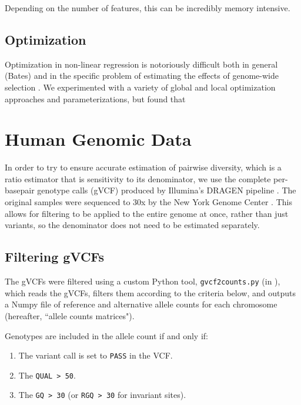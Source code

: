\documentclass[11pt]{article}
\begin{document}
Depending on the number of features, this can be incredibly memory intensive.

\subsection{Optimization}

Optimization in non-linear regression is notoriously difficult both in general
(Bates) and in the specific problem of estimating the effects of genome-wide
selection \parencite{Murphy2022-sj}. We experimented with a variety of global
and local optimization approaches and parameterizations, but found that 


\section{Human Genomic Data}

In order to try to ensure accurate estimation of pairwise diversity, which is a
ratio estimator that is sensitivity to its denominator, we use the complete
per-basepair genotype calls (gVCF) produced by Illumina's DRAGEN pipeline
\parencite{Illumina_Inc2020-dk}. The original samples were sequenced to 30x by
the New York Genome Center \parencite{Byrska-Bishop2022-tn}. This allows for
filtering to be applied to the entire genome at once, rather than just
variants, so the denominator does not need to be estimated separately.

\subsection{Filtering gVCFs}
\label{supp:filter}

The gVCFs were filtered using a custom Python tool, \texttt{gvcf2counts.py} (in
), which reads the gVCFs, filters them according to
the criteria below, and outputs a Numpy  file of reference and
alternative allele counts for each chromosome (hereafter, ``allele counts
matrices").

Genotypes are included in the allele count if and only if:

\begin{enumerate}
  \item The variant call is set to \texttt{PASS} in the VCF.
  \item The \texttt{QUAL > 50}.
  \item The \texttt{GQ > 30} (or \texttt{RGQ > 30} for invariant sites).
\end{enumerate}
\end{document}
